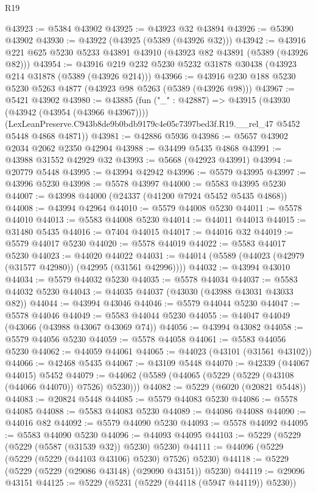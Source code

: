 \begin{lexlean}{R19}
\begin{coremodule}
@43923 := @5384 @43902
@43925 := @43923 @32 @43894
@43926 := @5390 @43902
@43930 := @43922 (@43925 (@5389 (@43926 @32)))
@43942 := @43916 @221 @625 @5230 @5233 @43891 @43910 (@43923 @82 @43891 (@5389 (@43926 @82)))
@43954 := @43916 @219 @232 @5230 @5232 @31878 @30438 (@43923 @214 @31878 (@5389 (@43926 @214)))
@43966 := @43916 @230 @188 @5230 @5230 @5263 @4877 (@43923 @98 @5263 (@5389 (@43926 @98)))
@43967 := @5421 @43902
@43980 := @43885
    (fun ("_" : @42887) =>
    @43915
      (@43930 (@43942 (@43954 (@43966 @43967))))
      (LexLeanPreserve.C943b8de9b0bdb9179c4e05c7397bed3f.R19.__rel_47 @5452 @5448 @4868 @4871))
@43981 := @42886 @5936
@43986 := @5657 @43902 @2034 @2062 @2350 @42904
@43988 := @34499 @5435 @4868
@43991 := @43988 @31552 @42929 @32
@43993 := @5668 (@42923 @43991)
@43994 := @20779 @5448
@43995 := @43994 @42942
@43996 := @5579 @43995
@43997 := @43996 @5230
@43998 := @5578 @43997
@44000 := @5583 @43995 @5230
@44007 := @43998 @44000 (@24337 (@41200 @7924 @5452 @5435 @4868))
@44008 := @43994 @42964
@44010 := @5579 @44008 @5230
@44011 := @5578 @44010
@44013 := @5583 @44008 @5230
@44014 := @44011 @44013
@44015 := @31480 @5435
@44016 := @7404 @44015
@44017 := @44016 @32
@44019 := @5579 @44017 @5230
@44020 := @5578 @44019
@44022 := @5583 @44017 @5230
@44023 := @44020 @44022
@44031 := @44014 (@5589 (@44023 (@42979 (@31577 @42980)) (@42995 (@31561 @42996))))
@44032 := @43994 @43010
@44034 := @5579 @44032 @5230
@44035 := @5578 @44034
@44037 := @5583 @44032 @5230
@44043 := @44035 @44037 (@43030 (@43988 @43031 @43033 @82))
@44044 := @43994 @43046
@44046 := @5579 @44044 @5230
@44047 := @5578 @44046
@44049 := @5583 @44044 @5230
@44055 := @44047 @44049 (@43066 (@43988 @43067 @43069 @74))
@44056 := @43994 @43082
@44058 := @5579 @44056 @5230
@44059 := @5578 @44058
@44061 := @5583 @44056 @5230
@44062 := @44059 @44061
@44065 := @44023 (@43101 (@31561 @43102))
@44066 := @42468 @5435
@44067 := @43109 @5448
@44070 := @42339 (@44067 @44015) @5452
@44079 := @44062 (@5589 (@44065 (@5229 (@5229 (@43108 (@44066 @44070)) @7526) @5230)))
@44082 := @5229 (@6020 (@20821 @5448))
@44083 := @20824 @5448
@44085 := @5579 @44083 @5230
@44086 := @5578 @44085
@44088 := @5583 @44083 @5230
@44089 := @44086 @44088
@44090 := @44016 @82
@44092 := @5579 @44090 @5230
@44093 := @5578 @44092
@44095 := @5583 @44090 @5230
@44096 := @44093 @44095
@44103 := @5229 (@5229 (@5229 (@5587 (@31539 @32)) @5230) @5230)
@44111 := @44096 (@5229 (@5229 (@5229 (@44103 @43106) @5230) @7526) @5230)
@44118 := @5229 (@5229 (@5229 (@29086 @43148) (@29090 @43151)) @5230)
@44119 := @29096 @43151
@44125 := @5229 (@5231 (@5229 (@44118 (@5947 @44119)) @5230))

\end{coremodule}
\end{lexlean}
